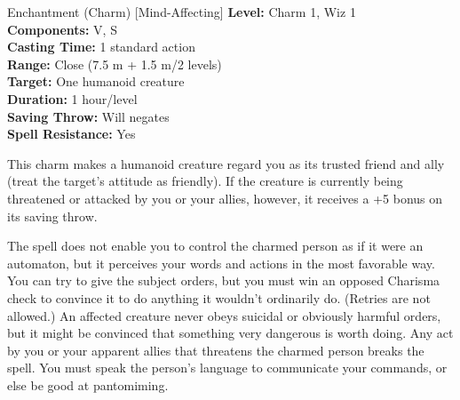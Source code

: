 {Enchantment (Charm) [Mind-Affecting]}
{
	\textbf{Level:}
	Charm 1, Wiz 1\\
	\textbf{Components:}
	V, S\\
	\textbf{Casting Time:}
	1 standard action\\
	\textbf{Range:}
	Close (7.5 m + 1.5 m/2 levels)\\
	\textbf{Target:}
	One humanoid creature\\
	\textbf{Duration:}
	1 hour/level\\
	\textbf{Saving Throw:}
	Will negates\\
	\textbf{Spell Resistance:}
	Yes\\
}
{
	This charm makes a humanoid creature regard you as its trusted friend and ally (treat the target's attitude as friendly). If the creature is currently being threatened or attacked by you or your allies, however, it receives a +5 bonus on its saving throw.

	The spell does not enable you to control the charmed person as if it were an automaton, but it perceives your words and actions in the most favorable way. You can try to give the subject orders, but you must win an opposed Charisma check to convince it to do anything it wouldn't ordinarily do. (Retries are not allowed.) An affected creature never obeys suicidal or obviously harmful orders, but it might be convinced that something very dangerous is worth doing.  Any act by you or your apparent allies that threatens the charmed person breaks the spell. You must speak the person's language to communicate your commands, or else be good at pantomiming.

}
